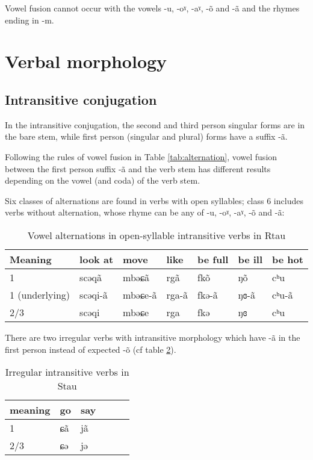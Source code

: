 \documentclass[oneside,a4paper,11pt]{article}
\newcommand{\ipa}[1]{{\phon #1}} %
\begin{document}
Vowel fusion cannot occur with the vowels -\ipa{u}, -\ipa{oˠ}, -\ipa{aˠ}, -\ipa{õ} and -\ipa{ã} and the rhymes ending in \ipa{-m}.
 
\section{Verbal morphology}


\subsection{Intransitive conjugation}
In the intransitive conjugation, the second and third person singular forms are in the bare stem, while first person (singular and plural) forms have a suffix \ipa{-ã}.

Following the rules of  vowel fusion in Table \ref{tab:alternation}, vowel fusion between the first person suffix \ipa{-ã} and the verb stem has different results depending on the vowel (and coda) of the verb stem. 
 
Six classes of alternations are found in verbs with open syllables; class 6 includes verbs without alternation, whose rhyme can be any of -\ipa{u}, -\ipa{oˠ}, -\ipa{aˠ}, -\ipa{õ} and -\ipa{ã}:
\begin{table}[H]
\caption{Vowel alternations in open-syllable intransitive verbs in Rtau} \label{tab:open.intr} \centering
\begin{tabular}{llll|ll|l}
\toprule
Meaning &	look at   &  	move   &  	like&  	be full     &  	 	be ill      &  	be hot       \\  
\midrule
1&	\ipa{scəqã} & 	\ipa{mbəɕã} & \ipa{rgã} &	\ipa{fkõ} & 	  	\ipa{ŋõ} & 	   	\ipa{cʰu}   \\ 
1 (underlying)&	\ipa{scəqi-ã} & 	\ipa{mbəɕe-ã} & \ipa{rga-ã} &	\ipa{fkə-ã} & 	  	\ipa{ŋɞ-ã} & 	   	\ipa{cʰu-ã}   \\ 
2/3&	\ipa{scəqi} & 	\ipa{mbəɕe} & \ipa{rga} & 	\ipa{fkə} & 	  	\ipa{ŋɞ} & 	 	\ipa{cʰu}  \\ 
\bottomrule
\end{tabular}
\end{table}


There are two irregular verbs with intransitive morphology  which have \ipa{-ã} in the first person instead of expected \ipa{-õ} (cf table \ref{tab:irr.intr}). 

\begin{table}[H]
\caption{Irregular intransitive verbs in Stau} \label{tab:irr.intr} \centering
\begin{tabular}{llllll}
\toprule
meaning &	go     & say &\\  
\midrule
1&	\ipa{ɕã}  	 &\ipa{jã} &\\ 
2/3&	\ipa{ɕə} & 	\ipa{jə} &\\ 
\bottomrule
\end{tabular}
\end{table}
\end{document}

